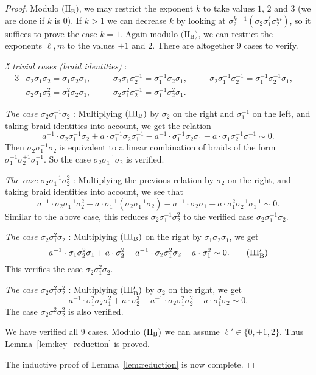 \documentclass[12pt]{amsart}
\theoremstyle{definition}
\theoremstyle{remark}
\begin{document}
\begin{proof}
Modulo $\text{(II$_\text{B}$)}$, we may restrict the exponent
$k$ to take values $1$, $2$ and $3$ (we are done if $k$ is $0$).
If $k>1$ we can decrease $k$ by looking at
$\sigma_2^{k-1}(\sigma_2\sigma_1^{\ell}\sigma_2^m)$, so it suffices to prove the case $k=1$.
Again modulo $\text{(II$_\text{B}$)}$, we can restrict the exponents $\ell, m$ to the values $\pm1$ and $2$.
There are altogether 9 cases to verify.

{\it 5 trivial cases (braid identities) }:
\begin{alignat*}{3}
&\sigma_2\sigma_1\sigma_2=\sigma_1\sigma_2\sigma_1, \quad
&&\sigma_2\sigma_1\sigma_2^{-1}=\sigma_1^{-1}\sigma_2\sigma_1, \quad
&&\sigma_2\sigma_1^{-1}\sigma_2^{-1}=\sigma_1^{-1}\sigma_2^{-1}\sigma_1, \quad
\\
&\sigma_2\sigma_1\sigma_2^2=\sigma_1^2\sigma_2\sigma_1, \quad
&&\sigma_2\sigma_1^2\sigma_2^{-1}=\sigma_1^{-1}\sigma_2^2\sigma_1. \quad
\end{alignat*}

{\it The case $\sigma_2\sigma_1^{-1}\sigma_2$ }:
Multiplying $\text{\rm(III$_{\text{B}}$)}$ by $\sigma_2$ on the right and $\sigma_1^{-1}$ on the left,
and taking braid identities into account, we get the relation
\[
a^{-1}\cdot \sigma_2\sigma_1^{-1}\sigma_2
+ a\cdot \sigma_1^{-1}\sigma_2\sigma_1^{-1}
- a^{-1}\cdot \sigma_1^{-1}\sigma_2\sigma_1
- a\cdot \sigma_1\sigma_2^{-1}\sigma_1^{-1}
\sim 0.
\]
Then $\sigma_2\sigma_1^{-1}\sigma_2$ is equivalent to a linear combination of
braids of the form $\sigma_1^{\pm1}\sigma_2^{\pm1}\sigma_1^{\pm1}$.
So the case $\sigma_2\sigma_1^{-1}\sigma_2$ is verified.

{\it The case $\sigma_2\sigma_1^{-1}\sigma_2^2$ }:
Multiplying the previous relation by $\sigma_2$ on the right,
and taking braid identities into account, we see that
\[
a^{-1}\cdot \sigma_2\sigma_1^{-1}\sigma_2^2
+ a\cdot \sigma_1^{-1}(\sigma_2\sigma_1^{-1}\sigma_2)
- a^{-1}\cdot \sigma_2\sigma_1
- a\cdot \sigma_1^2\sigma_2^{-1}\sigma_1^{-1}
\sim 0.
\]
Similar to the above case, this reduces $\sigma_2\sigma_1^{-1}\sigma_2^2$
to the verified case $\sigma_2\sigma_1^{-1}\sigma_2$.

{\it The case $\sigma_2\sigma_1^2\sigma_2$ }:
Multiplying $\text{\rm(III$_{\text{B}}$)}$ on the right by $\sigma_1\sigma_2\sigma_1$, we get
\[
a^{-1}\cdot \sigma_1\sigma_2^2\sigma_1
+ a\cdot \sigma_2^2
- a^{-1}\cdot \sigma_2\sigma_1^2\sigma_2
- a\cdot \sigma_1^2
\sim 0.
\tag*{$\text{\rm(III$'_{\text{B}}$)}$}
\]
This verifies the case $\sigma_2\sigma_1^2\sigma_2$.

{\it The case $\sigma_2\sigma_1^2\sigma_2^2$ }:
Multiplying $\text{\rm(III$'_{\text{B}}$)}$ by $\sigma_2$ on the right,
we get
\[
a^{-1}\cdot \sigma_1^2\sigma_2\sigma_1^2
+ a\cdot \sigma_2^3
- a^{-1}\cdot \sigma_2\sigma_1^2\sigma_2^2
- a\cdot \sigma_1^2\sigma_2
\sim 0.
\]
The case $\sigma_2\sigma_1^2\sigma_2^2$ is also verified.

We have verified all 9 cases.
Modulo $\text{\rm(II$_\text{B}$)}$ we can assume $\ell'\in\{0,\pm1,2\}$.
Thus Lemma~\ref{lem:key_reduction} is proved.

The inductive proof of Lemma~\ref{lem:reduction} is now complete.
\end{proof}
\end{document}
